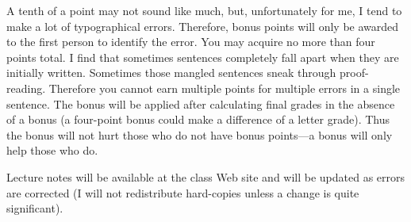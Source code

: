 \documentclass[12pt]{report}
\begin{document}
A tenth of a point may not sound like much, but, unfortunately for me,
I tend to make a lot of typographical errors.  Therefore, bonus points
will only be awarded to the first person to identify the error.  You
may acquire no more than four points total.  I find that sometimes
sentences completely fall apart when they are initially written.
Sometimes those mangled sentences sneak through proof-reading.
Therefore you cannot earn multiple points for multiple errors in a
single sentence.  The bonus will be applied after calculating final
grades in the absence of a bonus (a four-point bonus could make a
difference of a letter grade).  Thus the bonus will not hurt those who
do not have bonus points---a bonus will only help those who do.

Lecture notes will be available at the class Web site and will be
updated as errors are corrected (I will not redistribute hard-copies
unless a change is quite significant).
\end{document}
